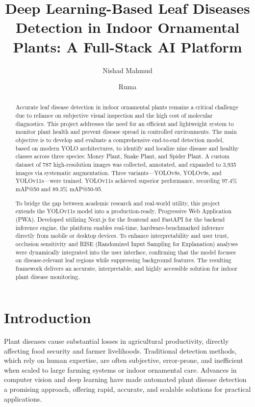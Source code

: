 \documentclass[12pt, a4paper]{article}
\title{\textbf{Deep Learning-Based Leaf Diseases Detection in Indoor Ornamental Plants: A Full-Stack AI Platform}}
\author{Nishad Mahmud \and Ruma}
\date{}
\begin{document}
\maketitle

\begin{abstract}
Accurate leaf disease detection in indoor ornamental plants remains a critical challenge due to reliance on subjective visual inspection and the high cost of molecular diagnostics. This project addresses the need for an efficient and lightweight system to monitor plant health and prevent disease spread in controlled environments. The main objective is to develop and evaluate a comprehensive end-to-end detection model, based on modern YOLO architectures, to identify and localize nine disease and healthy classes across three species: Money Plant, Snake Plant, and Spider Plant. A custom dataset of 787 high-resolution images was collected, annotated, and expanded to 3,935 images via systematic augmentation. Three variants—YOLOv8s, YOLOv9s, and YOLOv11s—were trained. YOLOv11s achieved superior performance, recording 97.4\% mAP@50 and 89.3\% mAP@50-95. 

To bridge the gap between academic research and real-world utility, this project extends the YOLOv11s model into a production-ready, Progressive Web Application (PWA). Developed utilizing Next.js for the frontend and FastAPI for the backend inference engine, the platform enables real-time, hardware-benchmarked inference directly from mobile or desktop devices. To enhance interpretability and user trust, occlusion sensitivity and RISE (Randomized Input Sampling for Explanation) analyses were dynamically integrated into the user interface, confirming that the model focuses on disease-relevant leaf regions while suppressing background features. The resulting framework delivers an accurate, interpretable, and highly accessible solution for indoor plant disease monitoring.
\end{abstract}

\newpage
\tableofcontents
\newpage

\section{Introduction}
Plant diseases cause substantial losses in agricultural productivity, directly affecting food security and farmer livelihoods. Traditional detection methods, which rely on human expertise, are often subjective, error-prone, and inefficient when scaled to large farming systems or indoor ornamental care. Advances in computer vision and deep learning have made automated plant disease detection a promising approach, offering rapid, accurate, and scalable solutions for practical applications.
\end{document}
